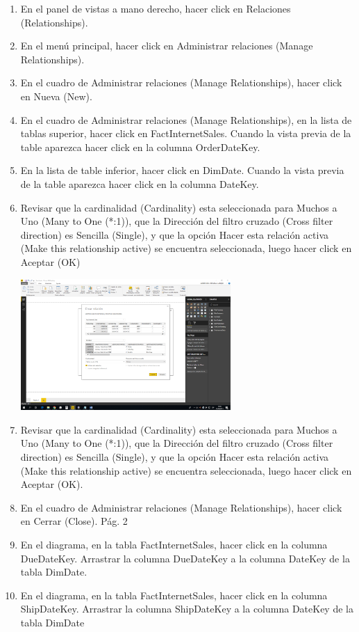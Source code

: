 \begin{itemize}
\begin{enumerate}
\item En el panel de vistas a mano derecho, hacer click en Relaciones (Relationships).
\item En el menú principal, hacer click en Administrar relaciones (Manage Relationships).
\item En el cuadro de Administrar relaciones (Manage Relationships), hacer click en Nueva (New).
\item En el cuadro de Administrar relaciones (Manage Relationships), en la lista de tablas superior, hacer click
en FactInternetSales. Cuando la vista previa de la table aparezca hacer click en la columna
OrderDateKey.
\item En la lista de table inferior, hacer click en DimDate. Cuando la vista previa de la table aparezca hacer click
en la columna DateKey.
\item Revisar que la cardinalidad (Cardinality) esta seleccionada para Muchos a Uno (Many to One (*:1)), que la
Dirección del filtro cruzado (Cross filter direction) es Sencilla (Single), y que la opción Hacer esta relación
activa (Make this relationship active) se encuentra seleccionada, luego hacer click en Aceptar (OK)

\begin{center}
\includegraphics[width=8cm]{./Imagenes/3.png}
\end{center}

\item Revisar que la cardinalidad (Cardinality) esta seleccionada para Muchos a Uno (Many to One (*:1)), que la
Dirección del filtro cruzado (Cross filter direction) es Sencilla (Single), y que la opción Hacer esta relación
activa (Make this relationship active) se encuentra seleccionada, luego hacer click en Aceptar (OK).
\item En el cuadro de Administrar relaciones (Manage Relationships), hacer click en Cerrar (Close).
Pág. 2
\item En el diagrama, en la tabla FactInternetSales, hacer click en la columna DueDateKey. Arrastrar la columna
DueDateKey a la columna DateKey de la tabla DimDate.
\item En el diagrama, en la tabla FactInternetSales, hacer click en la columna ShipDateKey. Arrastrar la
columna ShipDateKey a la columna DateKey de la tabla DimDate


\end{enumerate}
\end{itemize}
